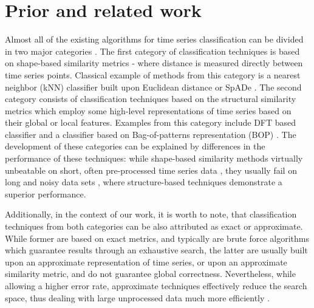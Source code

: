 \documentclass[conference]{IEEEtran}
\begin{document}
\section{Prior and related work} \label{prior}
Almost all of the existing algorithms for time series classification can be divided 
in two major categories \cite{survey}. 
The first category of classification techniques is based on 
shape-based similarity metrics - where distance is measured directly between time 
series points. Classical example of methods from this category is a nearest neighbor 
(kNN) classifier built upon Euclidean distance \cite{1NN} or SpADe \cite{spade}. 
The second category consists of classification techniques based on the 
structural similarity metrics which employ some high-level representations 
of time series based on their global or local features. 
Examples from this category include DFT based classifier \cite{DFT}
and a classifier based on Bag-of-patterns representation (BOP) \cite{bag_patterns}. 
The development of these categories can be explained by differences in the 
performance of these techniques: while shape-based similarity methods virtually 
unbeatable on short, often pre-processed time series data \cite{benchmark}, 
they usually fail on long and noisy data sets \cite{indexing},
where structure-based techniques demonstrate a superior performance. 

Additionally, in the context of our work, it is worth to note, that classification 
techniques from both categories can be also attributed as exact or approximate.
While former are based on exact metrics, and typically are brute force 
algorithms which guarantee results through an exhaustive search, 
the latter are usually built upon an approximate representation of 
time series, or upon an approximate similarity metric, and do not guarantee 
global correctness. Nevertheless, while allowing a higher error rate,
approximate techniques effectively reduce the search space, thus dealing with 
large unprocessed data much more efficiently \cite{paa, sax, streaming_sax}.

%
%
\end{document}

